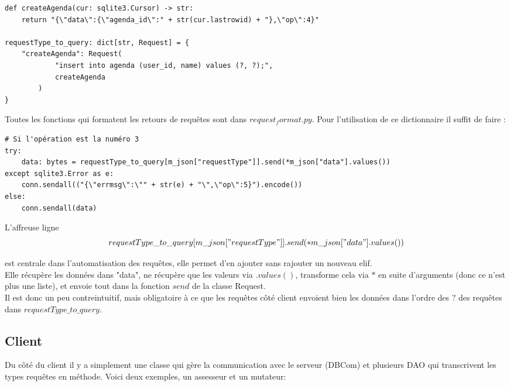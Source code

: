 \documentclass{article}
\begin{document}
\begin{lstlisting}
def createAgenda(cur: sqlite3.Cursor) -> str:
    return "{\"data\":{\"agenda_id\":" + str(cur.lastrowid) + "},\"op\":4}"

requestType_to_query: dict[str, Request] = {
    "createAgenda": Request(
            "insert into agenda (user_id, name) values (?, ?);",
            createAgenda
        )
}
\end{lstlisting}

\vspace{\medskipamount}
\noindent Toutes les fonctions qui formatent les retours de requêtes sont dans $request_format.py$.
Pour l'utilisation de ce dictionnaire il suffit de faire :

\begin{lstlisting}
# Si l'opération est la numéro 3
try:
    data: bytes = requestType_to_query[m_json["requestType"]].send(*m_json["data"].values())
except sqlite3.Error as e:
    conn.sendall(("{\"errmsg\":\"" + str(e) + "\",\"op\":5}").encode())
else:
    conn.sendall(data)
\end{lstlisting}

\noindent L'affreuse ligne
\[
    requestType\_to\_query[m\_json["requestType"]].send(*m\_json["data"].values())
\]

\noindent est centrale dans l'automatisation des requêtes, elle permet d'en ajouter sans rajouter un nouveau elif.
\\Elle récupère les données dans "data", ne récupère que les valeurs via $.values()$,
transforme cela via $*$ en suite d'arguments (donc ce n'est plus une liste),
et envoie tout dans la fonction $send$ de la classe Request.
\\Il est donc un peu contreintuitif,
mais obligatoire à ce que les requêtes côté client envoient bien les données dans l'ordre
des $?$ des requêtes dans $requestType\_to\_query$.

\newpage
\subsection{Client}
Du côté du client il y a simplement une classe qui gère la communication
avec le serveur (DBCom) et plusieurs DAO qui transcrivent les types requêtes en méthode.
Voici deux exemples, un assesseur et un mutateur:
\end{document}
